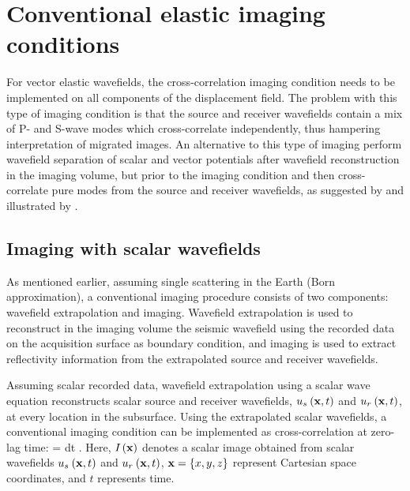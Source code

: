 \section{Conventional elastic imaging conditions}

For vector elastic wavefields, the cross-correlation imaging condition
needs to be implemented on all components of the displacement
field. The problem with this type of imaging condition is that the
source and receiver wavefields contain a mix of P- and S-wave modes
which cross-correlate independently, thus hampering interpretation of
migrated images. An alternative to this type of imaging 
perform wavefield separation of scalar and vector potentials
after wavefield reconstruction in the imaging volume, but prior to the
imaging condition and then cross-correlate pure modes from the source
and receiver wavefields, as suggested by \cite{GEO55-07-09140919} and
illustrated by \cite{Cunha.thesis}.

\subsection{Imaging with scalar wavefields}

As mentioned earlier, assuming single scattering in the Earth (Born
approximation), a conventional imaging procedure consists of two
components: wavefield extrapolation and imaging. Wavefield
extrapolation is used to reconstruct in the imaging volume the seismic
wavefield using the recorded data on the acquisition surface as 
boundary condition, and imaging is used to extract reflectivity
information from the extrapolated source and receiver wavefields.

Assuming scalar recorded data, wavefield extrapolation using a scalar
wave equation reconstructs scalar source and receiver wavefields,
${u_s}_{}\left ( {\mathbf x},t \right)$ and ${u_r}_{}\left ( {\mathbf x},t \right)$, at every location 
in the subsurface. Using the extrapolated scalar wavefields, a
conventional imaging condition \cite[]{Claerbout.iei} can be
implemented as cross-correlation at zero-lag time:
%
\beq \label{eqn:CIC}
\IM{}\ofx = \int \US{}\ofxt \UR{}\ofxt dt \;.
\eeq
%
Here, ${I}_{}\left ( {\mathbf x} \right)$ denotes a scalar image obtained from scalar
wavefields ${u_s}_{}\left ( {\mathbf x},t \right)$ and ${u_r}_{}\left ( {\mathbf x},t \right)$, ${\mathbf x}=\{x,y,z\}$ represent
Cartesian space coordinates, and $t$ represents time.


